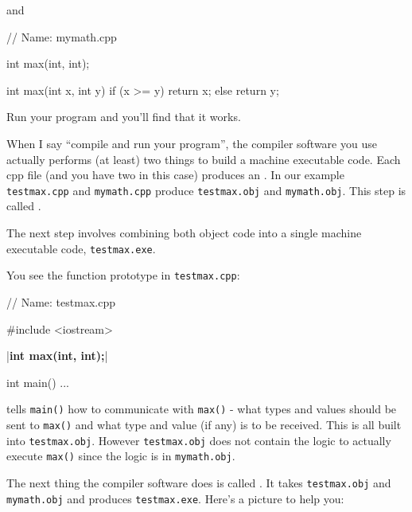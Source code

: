and

\begin{consolethree}[escapeinside=||]
// Name: mymath.cpp

int max(int, int);

int max(int x, int y)
{
    if (x >= y)
        return x;
    else
        return y;
}
\end{consolethree}

Run your program and you'll find that it works.

When I say ``compile and run your program'', the compiler software you
use actually performs (at least) two things to build a machine
executable code. Each cpp file (and you have two in this case) produces an . In our example \texttt{testmax.cpp} and \texttt{mymath.cpp} produce \texttt{testmax.obj} and \texttt{mymath.obj}. This step is called .

The next step involves combining both object code into a single machine
executable code, \texttt{testmax.exe}.

You see the function prototype in \texttt{testmax.cpp}:

\begin{consolethree}[escapeinside=||]
// Name: testmax.cpp

#include <iostream>

|\textbf{int max(int, int);}|

int main()
...
\end{consolethree}

tells \texttt{main()} how to communicate with \texttt{max()} - what types
and values should be sent to \texttt{max()} and what type and value (if
any) is to be received. This is all built into \texttt{testmax.obj}.
However \texttt{testmax.obj} does not contain the logic to actually
execute \texttt{max()} since the logic is in \texttt{mymath.obj}.

The next thing the compiler software does is called . It takes \texttt{testmax.obj} and \texttt{mymath.obj} and produces \texttt{testmax.exe}. Here's a picture to help you:

